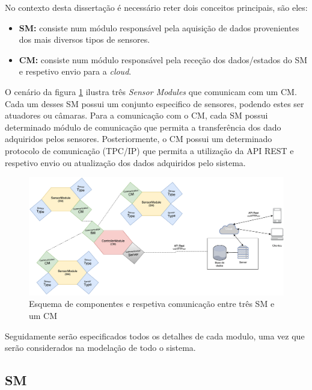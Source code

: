 No contexto desta dissertação é necessário reter dois conceitos principais, são eles: 

\begin{itemize}
	\item \textbf{\acl{SM}:} consiste num módulo responsável pela aquisição de dados provenientes dos mais diversos tipos de sensores. 
	
	
	\item \textbf{\acl{CM}:} consiste num módulo responsável pela receção dos dados/estados do \acl{SM} e respetivo envio para a \textit{cloud}.  
	
\end{itemize}


O cenário da figura \ref{esquema1} ilustra três \textit{Sensor Modules} que comunicam com um \acl{CM}. Cada um desses \acl{SM} possui um conjunto especifico de sensores, podendo estes ser atuadores ou câmaras. Para a comunicação com o \acl{CM}, cada \acl{SM} possui determinado módulo de comunicação que permita a transferência dos dado adquiridos pelos sensores. Posteriormente, o \acl{CM} possui um determinado protocolo de comunicação (TPC/IP) que permita a utilização da API REST e respetivo envio ou atualização dos dados adquiridos pelo sistema. 



\begin{figure}[h]
	\centering
	\includegraphics[scale=0.3]{esquemas/general-electronic-modules.pdf}
	\caption{Esquema de componentes e respetiva comunicação entre três \ac{SM} e um \ac{CM}}
	\label{esquema1}
\end{figure}


Seguidamente serão especificados todos os detalhes de cada modulo, uma vez que serão considerados na modelação de todo o sistema. 



\subsection{\acl{SM}}



